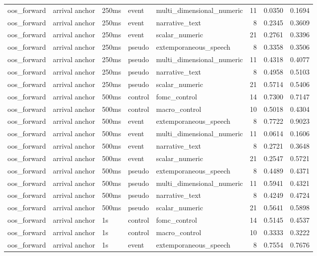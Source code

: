\begin{tabular}{lllllrrr}
oos_forward & arrival anchor & 250ms & event & multi_dimensional_numeric & 11 & 0.0350 & 0.1694 \\
oos_forward & arrival anchor & 250ms & event & narrative_text & 8 & 0.2345 & 0.3609 \\
oos_forward & arrival anchor & 250ms & event & scalar_numeric & 21 & 0.2761 & 0.3396 \\
oos_forward & arrival anchor & 250ms & pseudo & extemporaneous_speech & 8 & 0.3358 & 0.3506 \\
oos_forward & arrival anchor & 250ms & pseudo & multi_dimensional_numeric & 11 & 0.4318 & 0.4077 \\
oos_forward & arrival anchor & 250ms & pseudo & narrative_text & 8 & 0.4958 & 0.5103 \\
oos_forward & arrival anchor & 250ms & pseudo & scalar_numeric & 21 & 0.5714 & 0.5406 \\
oos_forward & arrival anchor & 500ms & control & fomc_control & 14 & 0.7300 & 0.7147 \\
oos_forward & arrival anchor & 500ms & control & macro_control & 10 & 0.5018 & 0.4304 \\
oos_forward & arrival anchor & 500ms & event & extemporaneous_speech & 8 & 0.7722 & 0.9023 \\
oos_forward & arrival anchor & 500ms & event & multi_dimensional_numeric & 11 & 0.0614 & 0.1606 \\
oos_forward & arrival anchor & 500ms & event & narrative_text & 8 & 0.2721 & 0.3648 \\
oos_forward & arrival anchor & 500ms & event & scalar_numeric & 21 & 0.2547 & 0.5721 \\
oos_forward & arrival anchor & 500ms & pseudo & extemporaneous_speech & 8 & 0.4489 & 0.4371 \\
oos_forward & arrival anchor & 500ms & pseudo & multi_dimensional_numeric & 11 & 0.5941 & 0.4321 \\
oos_forward & arrival anchor & 500ms & pseudo & narrative_text & 8 & 0.4249 & 0.4724 \\
oos_forward & arrival anchor & 500ms & pseudo & scalar_numeric & 21 & 0.5641 & 0.5898 \\
oos_forward & arrival anchor & 1s & control & fomc_control & 14 & 0.5145 & 0.4537 \\
oos_forward & arrival anchor & 1s & control & macro_control & 10 & 0.3333 & 0.3222 \\
oos_forward & arrival anchor & 1s & event & extemporaneous_speech & 8 & 0.7554 & 0.7676 \\

\end{tabular}
